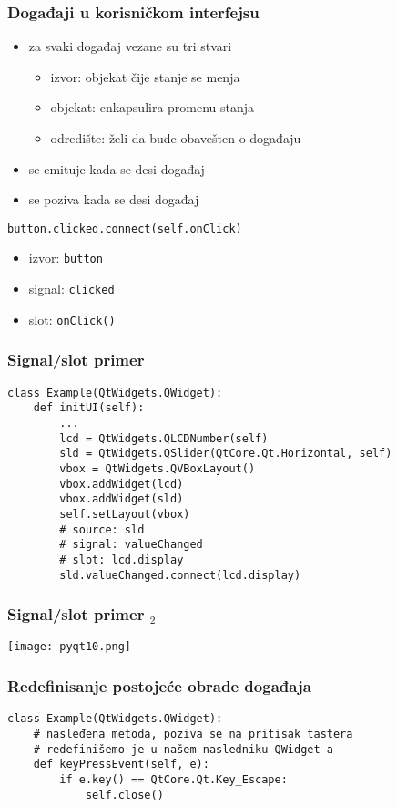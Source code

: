 \documentclass[utf8,compress,aspectratio=169]{beamer}
\begin{document}
\begin{frame}[fragile]
  \frametitle{Događaji u korisničkom interfejsu}
  \begin{itemize}
    \item za svaki događaj vezane su tri stvari
    \begin{itemize}
      \item izvor: objekat čije stanje se menja
      \item objekat: enkapsulira promenu stanja
      \item odredište: želi da bude obavešten o događaju
    \end{itemize}
    \item {} se emituje kada se desi događaj
    \item {} se poziva kada se desi događaj
  \end{itemize}
\begin{verbatim}
button.clicked.connect(self.onClick)
\end{verbatim}
  \begin{itemize}
    \item izvor: \texttt{button}
    \item signal: \texttt{clicked}
    \item slot: \texttt{onClick()}
  \end{itemize}
\end{frame}

\begin{frame}
  \frametitle{Signal/slot primer}
\begin{verbatim}
class Example(QtWidgets.QWidget):
    def initUI(self):
        ...
        lcd = QtWidgets.QLCDNumber(self)
        sld = QtWidgets.QSlider(QtCore.Qt.Horizontal, self)
        vbox = QtWidgets.QVBoxLayout()
        vbox.addWidget(lcd)
        vbox.addWidget(sld)
        self.setLayout(vbox)
        # source: sld
        # signal: valueChanged
        # slot: lcd.display
        sld.valueChanged.connect(lcd.display)
\end{verbatim}
\end{frame}

\begin{frame}[fragile]
  \frametitle{Signal/slot primer $_2$}
\begin{center}
\texttt{[image: pyqt10.png]}
\end{center}
\end{frame}

\begin{frame}[fragile]
  \frametitle{Redefinisanje postojeće obrade događaja}
\begin{verbatim}
class Example(QtWidgets.QWidget):
    # nasleđena metoda, poziva se na pritisak tastera
    # redefinišemo je u našem nasledniku QWidget-a
    def keyPressEvent(self, e):
        if e.key() == QtCore.Qt.Key_Escape:
            self.close()
\end{verbatim}
\end{frame}
\end{document}
